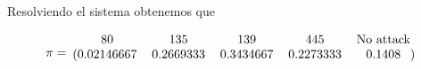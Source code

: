 \documentclass[11pt]{article}
\begin{document}
Resolviendo el sistema obtenemos que

\begin{equation*}
  \pi = 
  \begin{blockarray}{ccccc}
    80 & 135 & 139 & 445 & \text{No attack} \\
    \begin{block}{(ccccc)}
      0.02146667 & 0.2669333 & 0.3434667 & 0.2273333 & 0.1408 \\
    \end{block}
  \end{blockarray}
\end{equation*}
\end{document}
